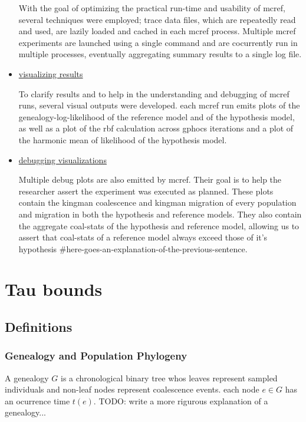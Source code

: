 \documentclass[10pt,a4paper]{article}
\begin{document}
\begin{itemize}
With the goal of optimizing the practical run-time and usability of mcref, several techniques were employed; trace data files, which are repeatedly read and used, are lazily loaded and cached in each mcref process. Multiple mcref experiments are launched using a single command and are cocurrently run in multiple processes, eventually aggregating summary results to a single log file. 

\item \underline{visualizing results}

To clarify results and to help in the understanding and debugging of mcref runs, several visual outputs were developed. each mcref run emits plots of the genealogy-log-likelihood of the reference model and of the hypothesis model, as well as a plot of the rbf calculation across gphocs iterations and a plot of the harmonic mean of likelihood of the hypothesis model.

\item \underline{debugging visualizations}

Multiple debug plots are also emitted by mcref. Their goal is to help the researcher assert the experiment was executed as planned. These plots contain the kingman coalescence and kingman migration of every population and migration in both the hypothesis and reference models. They also contain the aggregate coal-stats of the hypothesis and reference model, allowing us to assert that coal-stats of a reference model always exceed those of it's hypothesis \#here-goes-an-explanation-of-the-previous-sentence. 
\end{itemize}

\section{Tau bounds}

\subsection{Definitions}

\subsubsection{Genealogy and Population Phylogeny}
A genealogy $G$ is a chronological binary tree whos leaves represent sampled individuals and non-leaf nodes represent coalescence events. each node $e \in G$ has an ocurrence time $t(e)$. TODO: write a more rigurous explanation of a genealogy...
\end{document}
